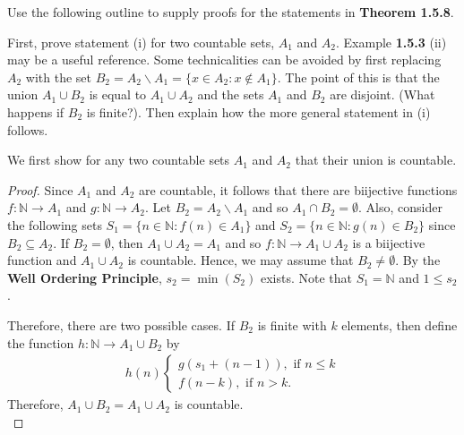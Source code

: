 \documentclass[12pt]{article}
\newcommand{\N}{\mathbb{N}}
\newenvironment{problem}[2][Problem]{\begin{trivlist}
		\item[\hskip \labelsep {\bfseries #1}\hskip \labelsep {\bfseries #2.}]}{\end{trivlist}}
\newenvironment{solution}[2][Solution]{\begin{trivlist}
		\item[\hskip \labelsep {\bfseries #1}\hskip \labelsep {\bfseries #2.}]}{\end{trivlist}}
\begin{document}
	\begin{problem}{1.5.3}
		Use the following outline to supply proofs for the statements in \textbf{Theorem 1.5.8}.
		\begin{enumerate}[label=(\alph*)]
			\item First, prove statement (i) for two countable sets, $A_{1}$ and $A_{2}$. Example \textbf{1.5.3} (ii) may be a useful reference. Some technicalities can be avoided by first replacing $A_{2}$ with the set $B_{2} =A_{2}\backslash A_{1} = \{x\in A_{2}:x\not\in A_{1}\}$. The point of this is that the union $A_{1}\cup B_{2}$ is equal to $A_{1}\cup A_{2}$ and the sets $A_{1}$ and $B_{2}$ are disjoint. (What happens if $B_{2}$ is finite?). Then explain how the more general statement in (i) follows.
			\begin{solution}{(a)}
				We first show for any two countable sets $A_{1}$ and $A_{2}$ that their union is countable.
				\begin{proof}
					Since $A_{1}$ and $A_{2}$ are countable, it follows that there are biijective functions $f:\N \to A_{1}$ and $g:\N \to A_{2}$. Let $B_{2} = A_{2}\backslash A_{1}$ and so $A_{1}\cap B_{2} = \emptyset$. Also, consider the following sets $S_{1} = \{n\in \N: f(n)\in A_{1}\}$ and $S_{2} = \{n\in \N: g(n) \in B_{2}\}$ since $B_{2} \subseteq A_{2}$. If $B_{2} = \emptyset$, then $A_{1}\cup A_{2} = A_{1}$ and so $f:\N \to A_{1}\cup A_{2}$ is a biijective function and $A_{1}\cup A_{2}$ is countable. Hence, we may assume that $B_{2}\neq \emptyset$. By the \textbf{Well Ordering Principle}, $s_{2} = \min (S_{2})$ exists. Note that $S_{1} = \N$ and $1\leq s_{2}$.
					
					Therefore, there are two possible cases. If $B_{2}$ is finite with $k$ elements, then define the function $h:\N \to A_{1}\cup B_{2}$ by
					\begin{align*}
						h(n) \begin{cases}
							g(s_{1}+(n-1)), \text{ if }n\leq k\\
							f(n-k), \text{ if }n>k.
						\end{cases}
					\end{align*}
				Therefore, $A_{1}\cup B_{2} = A_{1}\cup A_{2}$ is countable.\\
				

\end{proof}
\end{solution}
\end{enumerate}
\end{problem}
\end{document}

